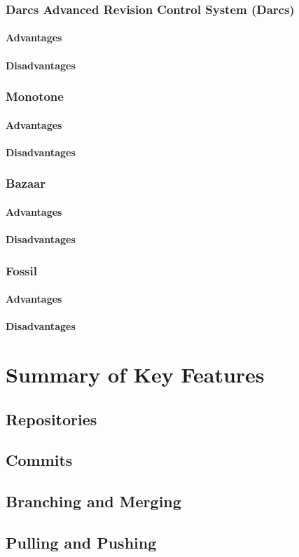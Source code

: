 \subsubsection{Darcs Advanced Revision Control System (Darcs)}
\paragraph{Advantages}
\paragraph{Disadvantages}
\subsubsection{Monotone}
\paragraph{Advantages}
\paragraph{Disadvantages}
\subsubsection{Bazaar}
\paragraph{Advantages}
\paragraph{Disadvantages}
\subsubsection{Fossil}
\paragraph{Advantages}
\paragraph{Disadvantages}
\section{Summary of Key Features}
\subsection{Repositories}
\subsection{Commits}
\subsection{Branching and Merging}
\subsection{Pulling and Pushing}
